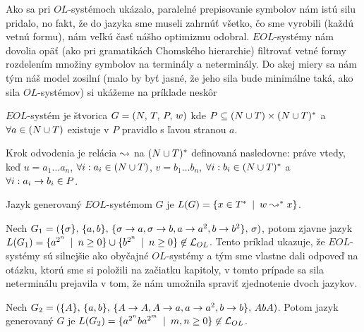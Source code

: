 Ako sa pri $OL$-systémoch ukázalo, paralelné prepisovanie symbolov
nám istú silu pridalo, no fakt, že do jazyka sme museli zahrnúť
všetko, čo sme vyrobili (každú vetnú formu), nám veľkú časť nášho
optimizmu odobral. $EOL$-systémy nám dovolia opäť (ako pri
gramatikách Chomského hierarchie) filtrovať vetné formy rozdelením
množiny symbolov na terminály a neterminály. Do akej miery sa nám
tým náš model zosilní (malo by byť jasné, že jeho sila bude
minimálne taká, ako sila $OL$-systémov) si ukážeme na príklade
neskôr

\begin{definicia}
  $EOL$-systém je štvorica $G = (N,\,T,\,P,\,w)$ kde
  $P \subseteq (N \cup T)\times(N \cup T)^{*}$ a 
  $\forall a\in (N\cup T)$ existuje v $P$
  pravidlo s ľavou stranou $a$.
\end{definicia}

\begin{definicia}
  Krok odvodenia je relácia $\leadsto$ na $(N \cup T)^{*}$ definovaná
  nasledovne:  práve vtedy, keď
  $u = a_1 \dots a_n$, $\forall i: a_i \in (N\cup T)$,
  $v = b_1 \dots b_n$, $\forall i: b_i \in (N\cup T)^{*}$ a 
  $\forall i: a_i \rightarrow b_i \in P$.
\end{definicia}

\begin{definicia}
  Jazyk generovaný $EOL$-systémom $G$ je
  $L(G) = \{x \in T^{*} \enspace |\enspace w \leadsto^* x\}$.
\end{definicia}

\begin{priklad}
  Nech $G_1 = (\{\sigma\},\,\{a,b\},\,
    \{\sigma \rightarrow a, \sigma \rightarrow b, a \rightarrow a^2,
      b \rightarrow b^2\}
    ,\,\sigma)$, potom zjavne jazyk
  $L(G_1) = \{a^{2^n} \enspace |\enspace n \ge 0\} \cup
    \{b^{2^n} \enspace |\enspace n \ge 0\} \not \in \mathcal{L}_{OL}$.
  Tento príklad ukazuje, že
  $EOL$-systémy sú silnejšie ako obyčajné $OL$-systémy a tým sme
  vlastne dali odpoveď na otázku, ktorú sme si položili na začiatku
  kapitoly, v tomto prípade sa sila neterminálu prejavila v tom, že
  nám umožnila spraviť zjednotenie dvoch jazykov.
\end{priklad}

\begin{priklad}
  Nech $G_2 = (\{A\},\,\{a,b\},\,
      \{A \rightarrow A, A \rightarrow a, a \rightarrow a^2, b \rightarrow b\}
      ,\,AbA)$.
  Potom jazyk ge\-ne\-ro\-va\-ný $G$ je
  $L(G_2) = \{a^{2^n} b a^{2^m} \enspace |\enspace m,n \ge 0\} \not\in
  \mathcal{L}_{OL}$.
\end{priklad}

